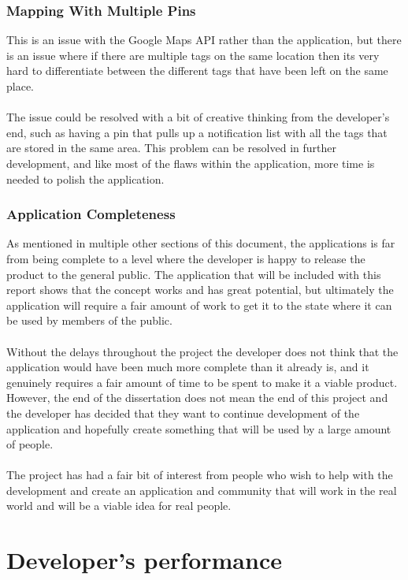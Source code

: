 \subsubsection{Mapping With Multiple Pins}

This is an issue with the Google Maps API rather than the application, but there is an issue where if there are multiple tags on the same location then its very hard to differentiate between the different tags that have been left on the same place.\\
\\
The issue could be resolved with a bit of creative thinking from the developer's end, such as having a pin that pulls up a notification list with all the tags that are stored in the same area. This problem can be resolved in further development, and like most of the flaws within the application, more time is needed to polish the application.

\subsubsection{Application Completeness}

As mentioned in multiple other sections of this document, the applications is far from being complete to a level where the developer is happy to release the product to the general public. The application that will be included with this report shows that the concept works and has great potential, but ultimately the application will require a fair amount of work to get it to the state where it can be used by members of the public.\\
\\
Without the delays throughout the project the developer does not think that the application would have been much more complete than it already is, and it genuinely requires a fair amount of time to be spent to make it a viable product. However, the end of the dissertation does not mean the end of this project and the developer has decided that they want to continue development of the application and hopefully create something that will be used by a large amount of people.\\
\\
The project has had a fair bit of interest from people who wish to help with the development and create an application and community that will work in the real world and will be a viable idea for real people.


\section{Developer's performance}

